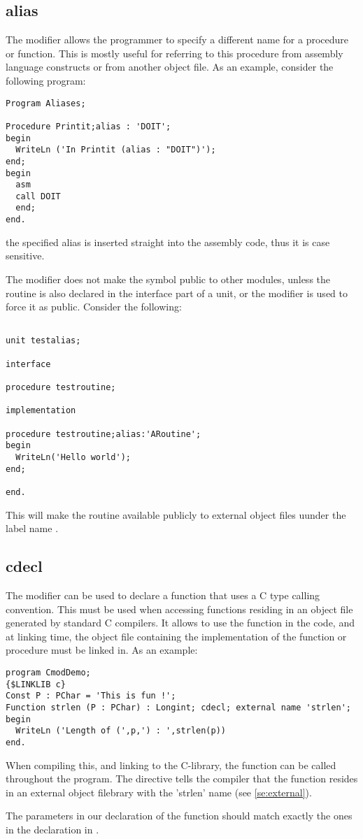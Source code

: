 \subsection{alias}
The  modifier allows the programmer to specify a different name for a
procedure or function. This is mostly useful for referring to this procedure
from assembly language constructs or from another object file. As an example,
consider the following program:
\begin{verbatim}
Program Aliases;

Procedure Printit;alias : 'DOIT';
begin
  WriteLn ('In Printit (alias : "DOIT")');
end;
begin
  asm
  call DOIT
  end;
end.
\end{verbatim}
\begin{remark} the specified alias is inserted straight into the assembly
code, thus it is case sensitive.
\end{remark}
The  modifier does not make the symbol public to other modules,
unless the routine is also declared in the interface part of a unit, or
the  modifier is used to force it as public. Consider the
following:
\begin{verbatim}

unit testalias;

interface

procedure testroutine;

implementation

procedure testroutine;alias:'ARoutine';
begin
  WriteLn('Hello world');
end;

end.
\end{verbatim}

This will make the routine  available publicly to
external object files uunder the label name .

\subsection{cdecl}
\label{se:cdecl}
The  modifier can be used to declare a function that uses a C
type calling convention. This must be used when accessing functions residing in
an object file generated by standard C compilers. It allows  to use the function in
the code, and at linking time, the object file containing the
 implementation of the function or procedure must be linked in.
As an example:
\begin{verbatim}
program CmodDemo;
{$LINKLIB c}
Const P : PChar = 'This is fun !';
Function strlen (P : PChar) : Longint; cdecl; external name 'strlen';
begin
  WriteLn ('Length of (',p,') : ',strlen(p))
end.
\end{verbatim}
When compiling this, and linking to the C-library, the  function
can be called throughout the program. The  directive tells
the compiler that the function resides in an external object filebrary
with the 'strlen' name (see \ref{se:external}).
\begin{remark}
The parameters in our declaration of the  function should
match exactly the ones in the declaration in .
\end{remark}

